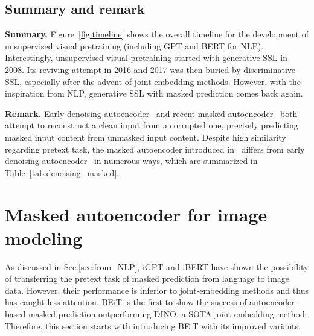 \documentclass[10pt,journal,compsoc]{IEEEtran}
\begin{document}
\subsection{Summary and remark}
\textbf{Summary.} Figure~\ref{fig:timeline} shows the overall timeline for the development of unsupervised visual pretraining (including GPT and BERT for NLP). Interestingly, unsupervised visual pretraining started with generative SSL in 2008. Its reviving attempt in 2016 and 2017 was then buried by discriminative SSL, especially after the advent of joint-embedding methods. However, with the inspiration from NLP, generative SSL with masked prediction comes back again.



\begin{table}[htb] \centering
\vspace{-10pt}
\caption{Comparison of denosing autoencoder~\cite{vincent2008extracting} and masked autoencoder~\cite{he2022masked}}
\label{tab:denoising_masked}
\end{table}
\textbf{Remark.} Early denoising autoencoder~\cite{vincent2008extracting} and recent masked autoencoder~\cite{he2022masked} both attempt to reconstruct a clean input from a corrupted one, precisely predicting masked input content from unmasked input content. Despite high similarity regarding pretext task, the masked autoencoder introduced in~\cite{he2022masked} differs from early denoising autoencoder~\cite{vincent2008extracting} in numerous ways, which are summarized in Table~\ref{tab:denoising_masked}. 


\section{Masked autoencoder for image modeling}
\label{sec:MIM_understanding}
As discussed in Sec.\ref{sec:from_NLP}, iGPT and iBERT have shown the possibility of transferring the pretext task of masked prediction from language to image data. However, their performance is inferior to joint-embedding methods and thus has caught less attention. BEiT is the first to show the success of autoencoder-based masked prediction outperforming DINO, a SOTA joint-embedding method. Therefore, this section starts with introducing BEiT with its improved variants.
\end{document}
